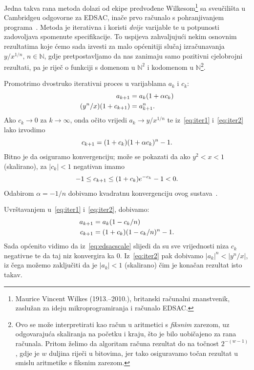 \documentclass[12pt]{scrartcl}
\begin{document}
Jedna takva rana metoda dolazi od ekipe predvođene Wilkesom\footnote{Maurice
Vincent Wilkes (1913.--2010.), britanski računalni znanstvenik, zaslužan za ideju mikroprogramiranja i računalo EDSAC.}
sa sveučilišta u Cambridgeu odgovorne za EDSAC,
inače prvo računalo s pohranjivanjem programa~\cite[str.~32]{ribaric}. Metoda je iterativna i koristi \emph{dvije} varijable te 
u potpunosti zadovoljava spomenute specifikacije. To uspijeva zahvaljujući nekim osnovnim rezultatima koje ćemo sada izvesti za
malo općenitiji slučaj izračunavanja $y/x^{1/n},\,n\in\mathbb{N}$, gdje pretpostavljamo da nas zanimaju samo pozitivni cjelobrojni rezultati, pa
je riječ o funkciji s domenom u $\mathbb{N}^2$ i kodomenom u $\mathbb N$\footnote{Ovo se može interpretirati kao račun u aritmetici
s \emph{fiksnim} zarezom, uz odgovarajuća skaliranja na početku i kraju, što je bilo uobičajeno za rana računala. Pritom želimo da algoritam
računa rezultat do na točnost $2^{-(w-1)}$, gdje je $w$ duljina riječi u bitovima, jer tako osiguravamo točan rezultat u smislu aritmetike
s fiksnim zarezom.}.

Promotrimo dvostruko iterativni proces u varijablama $a_k$ i $c_k$:
\begin{align}
        a_{k+1} &= a_k(1 + \alpha c_k)\label{eq:iter1}\\
        (y^n / x)(1 + c_{k+1}) &= a^n_{k+1}\label{eq:iter2}\text.
\end{align}
Ako $c_k\to 0$ za $k\to\infty$, onda očito vrijedi $a_k\to y/x^{1/n}$ te iz~\eqref{eq:iter1} i~\eqref{eq:iter2} lako izvodimo
\begin{equation}
    c_{k+1} = (1+c_k)(1+\alpha c_k)^n - 1\text.
\end{equation}
Bitno je da osiguramo konvergenciju; može se pokazati da ako $y^2<x<1$ (skalirano), za $|c_k|<1$ negativan imamo
\begin{equation}\label{eq:edsacscale}
    -1\leq c_{k+1}\leq(1+c_k)e^{-c_k}-1<0\text.
\end{equation}
Odabirom $\alpha=-1/n$ dobivamo kvadratnu konvergenciju ovog sustava~\cite{gower}.

Uvrštavanjem u~\eqref{eq:iter1} i~\eqref{eq:iter2}, dobivamo:
\begin{align}
    a_{k+1} &= a_k(1-c_k/n)\\
    c_{k+1} &= (1+c_k)(1-c_k/n)^n - 1\text.
\end{align}
Sada općenito vidimo da iz~\eqref{eq:edsacscale} slijedi
da su sve vrijednosti niza $c_k$ negativne te da taj niz konvergira ka $0$. Iz~\eqref{eq:iter2} pak dobivamo
$|a_k|^n<|y^n/x|$, iz čega možemo zaključiti da je $|a_k|<1$ (skalirano) čim je konačan rezultat isto takav.
\end{document}
